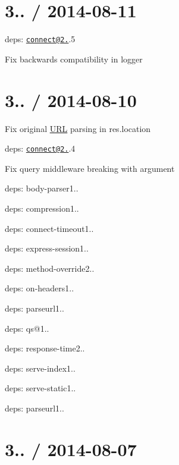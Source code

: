 \section*{3.. / 2014-\/08-\/11 }


\begin{DoxyItemize}
\item deps\+: \href{mailto:connect@2.25}{\tt connect@2.}.5
\begin{DoxyItemize}
\item Fix backwards compatibility in {\ttfamily logger}
\end{DoxyItemize}
\end{DoxyItemize}

\section*{3.. / 2014-\/08-\/10 }


\begin{DoxyItemize}
\item Fix original \hyperlink{struct_u_r_l}{U\+R\+L} parsing in {\ttfamily res.\+location}
\item deps\+: \href{mailto:connect@2.25}{\tt connect@2.}.4
\begin{DoxyItemize}
\item Fix {\ttfamily query} middleware breaking with argument
\item deps\+: body-\/parser1..
\item deps\+: compression1..
\item deps\+: connect-\/timeout1..
\item deps\+: express-\/session1..
\item deps\+: method-\/override2..
\item deps\+: on-\/headers1..
\item deps\+: parseurl1..
\item deps\+: qs@1..
\item deps\+: response-\/time2..
\item deps\+: serve-\/index1..
\item deps\+: serve-\/static1..
\end{DoxyItemize}
\item deps\+: parseurl1..
\end{DoxyItemize}

\section*{3.. / 2014-\/08-\/07 }


